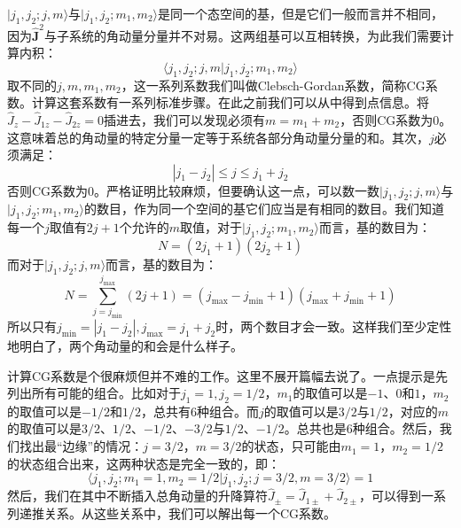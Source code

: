 \documentclass{ctexart}
\begin{document}
$|j_1,j_2;j,m\rangle$与$|j_1,j_2;m_1,m_2\rangle$是同一个态空间的基，但是它们一般而言并不相同，因为$\hat{\bm{J}}^2$与子系统的角动量分量并不对易。这两组基可以互相转换，为此我们需要计算内积：
\begin{equation}
\langle j_1,j_2;j,m|j_1,j_2;m_1,m_2\rangle
\end{equation}
取不同的$j,m,m_1,m_2$，这一系列系数我们叫做Clebsch-Gordan系数，简称CG系数。计算这套系数有一系列标准步骤。在此之前我们可以从中得到点信息。将$\hat{J}_z-\hat{J}_{1z}-\hat{J}_{2z}=0$插进去，我们可以发现必须有$m=m_1+m_2$，否则CG系数为0。这意味着总的角动量的特定分量一定等于系统各部分角动量分量的和。其次，$j$必须满足：
\begin{equation}
|j_1-j_2|\leq j\leq j_1+j_2
\end{equation}
否则CG系数为0。严格证明比较麻烦，但要确认这一点，可以数一数$|j_1,j_2;j,m\rangle$与$|j_1,j_2;m_1,m_2\rangle$的数目，作为同一个空间的基它们应当是有相同的数目。我们知道每一个$j$取值有$2j+1$个允许的$m$取值，对于$|j_1,j_2;m_1,m_2\rangle$而言，基的数目为：
\begin{equation}
N=(2j_1+1)(2j_2+1)
\end{equation}
而对于$|j_1,j_2;j,m\rangle$而言，基的数目为：
\begin{equation}
N=\sum_{j=j_{\min}}^{j_{\max}}(2j+1)=(j_{\max}-j_{\min}+1)(j_{\max}+j_{\min}+1)
\end{equation}
所以只有$j_{\min}=|j_1-j_2|,j_{\max}=j_1+j_2$时，两个数目才会一致。这样我们至少定性地明白了，两个角动量的和会是什么样子。

计算CG系数是个很麻烦但并不难的工作。这里不展开篇幅去说了。一点提示是先列出所有可能的组合。比如对于$j_1=1,j_2=1/2$，$m_1$的取值可以是$-1$、$0$和$1$，$m_2$的取值可以是$-1/2$和$1/2$，总共有6种组合。而$j$的取值可以是$3/2$与$1/2$，对应的$m$的取值可以是$3/2$、$1/2$、$-1/2$、$-3/2$与$1/2$、$-1/2$。总共也是6种组合。然后，我们找出最“边缘”的情况：$j=3/2，m=3/2$的状态，只可能由$m_1=1，m_2=1/2$的状态组合出来，这两种状态是完全一致的，即：
\begin{equation}
\langle j_1,j_2;m_1=1,m_2=1/2|j_1,j_2;j=3/2,m=3/2\rangle=1
\end{equation}
然后，我们在其中不断插入总角动量的升降算符$\hat{J}_\pm=\hat{J}_{1\pm}+\hat{J}_{2\pm}$，可以得到一系列递推关系。从这些关系中，我们可以解出每一个CG系数。
\end{document}
